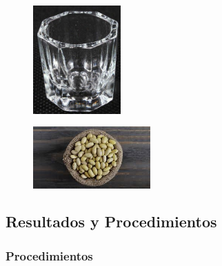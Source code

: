 \begin{figure}[H]
	\begin{center}
		\includegraphics[width = 0.3\textwidth]{Imagenes/vaso.jpg}
	\end{center}
\end{figure}
\begin{figure}[H]
	\begin{center}
		\includegraphics[width = 0.4\textwidth]{Imagenes/frijoles.jpeg}
	\end{center}
\end{figure}

\subsection{Resultados y Procedimientos}



\subsubsection{Procedimientos}

